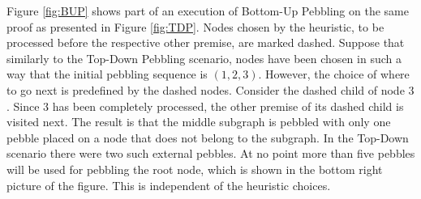 \begin{example}
Figure \ref{fig:BUP} shows part of an execution of Bottom-Up Pebbling on the same proof as presented in Figure \ref{fig:TDP}.
Nodes chosen by the heuristic, to be processed before the respective other premise, are marked dashed. 
Suppose that similarly to the Top-Down Pebbling scenario, nodes have been chosen in such a way that the initial pebbling sequence is $(1,2,3)$.
However, the choice of where to go next is predefined by the dashed nodes. 
Consider the dashed child of node $3$. 
Since $3$ has been completely processed, the other premise of its dashed child is visited next. 
The result is that the middle subgraph is pebbled with only one pebble placed on a node that does not belong to the subgraph.
In the Top-Down scenario there were two such external pebbles. 
At no point more than five pebbles will be used for pebbling the root node, which is shown in the bottom right picture of the figure. This is independent of the heuristic choices.


\end{example}
